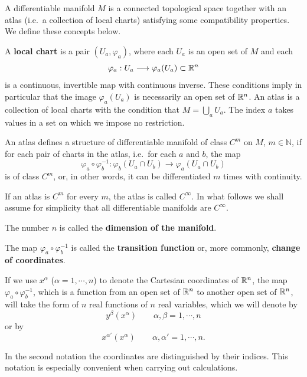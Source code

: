 \begin{points}
\item A differentiable manifold $M$ is a connected topological space together with an atlas (i.e.\ a collection of local charts) satisfying some compatibility properties. We define these concepts below.

\item A \textbf{local chart} is a pair $(U_a,\varphi_a)$, where each $U_a$ is an open set of $M$ and each
\[
  \varphi_a:U_a\longrightarrow\varphi_a(U_a)\subset\mathbb{R}^n
\]
is a continuous, invertible map with continuous inverse. These conditions imply in particular that the image $\varphi_a(U_a)$ is necessarily an open set of $\mathbb{R}^n$. An atlas is a collection of local charts with the condition that $M=\bigcup_aU_a$. The index $a$ takes values in a set on which we impose no restriction.

\item An atlas defines a structure of differentiable manifold of class $C^m$ on $M$, $m\in\mathbb N$, if for each pair of charts in the atlas, i.e.\ for each $a$ and $b$, the map
\[
  \varphi_a\circ\varphi_b^{-1}:\varphi_b(U_a\cap U_b)\longrightarrow\varphi_a(U_a\cap U_b)
\]
is of class $C^m$, or, in other words, it can be differentiated $m$ times with continuity.

\item If an atlas is $C^m$ for every $m$, the atlas is called $C^\infty$. In what follows we shall assume for simplicity that all differentiable manifolds are $C^\infty$.

\item The number $n$ is called the \textbf{dimension of the manifold}.

\item The map $\varphi_a\circ\varphi_b^{-1}$ is called the \textbf{transition function} or, more commonly, \textbf{change of coordinates}.

\item If we use $x^\alpha$ ($\alpha=1,\cdots,n$) to denote the Cartesian coordinates of $\mathbb{R}^n$, the map $\varphi_a\circ\varphi_b^{-1}$, which is a function from an open set of $\mathbb{R}^n$ to another open set of $\mathbb{R}^n$, will take the form of $n$ real functions of $n$ real variables, which we will denote by
\[
  y^\beta(x^\alpha)\qquad\alpha,\beta=1,\cdots,n
\]
or by
\[
  x^{\alpha'}(x^\alpha)\qquad\alpha,\alpha'=1,\cdots,n .
\]

\item In the second notation the coordinates are distinguished by their indices. This notation is especially convenient when carrying out calculations.
\end{points}

